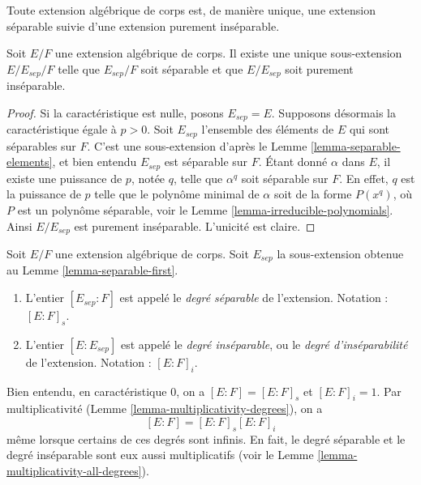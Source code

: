 \begin{lemma}
\label{lemma-separable-first}
\begin{slogan}
Toute extension algébrique de corps est, de manière unique, une extension
séparable suivie d'une extension purement inséparable.
\end{slogan}
Soit $E/F$ une extension algébrique de corps. Il existe une unique sous-extension
$E/E_{sep}/F$ telle que $E_{sep}/F$ soit séparable et que $E/E_{sep}$ soit
purement inséparable.
\end{lemma}

\begin{proof}
Si la caractéristique est nulle, posons $E_{sep} = E$. Supposons désormais la caractéristique
égale à $p > 0$. Soit $E_{sep}$ l'ensemble des éléments de $E$ qui sont séparables
sur $F$. C'est une sous-extension d'après le Lemme \ref{lemma-separable-elements},
et bien entendu $E_{sep}$ est séparable sur $F$. Étant donné $\alpha$ dans $E$,
il existe une puissance de $p$, notée $q$, telle que $\alpha^q$ soit séparable sur $F$.
En effet, $q$ est la puissance de $p$ telle que le polynôme minimal de
$\alpha$ soit de la forme $P(x^q)$, où $P$ est un polynôme séparable, voir le
Lemme \ref{lemma-irreducible-polynomials}. Ainsi $E/E_{sep}$ est purement
inséparable. L'unicité est claire.
\end{proof}

\begin{definition}
\label{definition-insep-degree}
Soit $E/F$ une extension algébrique de corps. Soit $E_{sep}$ la sous-extension
obtenue au Lemme \ref{lemma-separable-first}.
\begin{enumerate}
\item L'entier $[E_{sep} : F]$ est appelé le {\it degré séparable}
de l'extension. Notation : $[E : F]_s$.
\item L'entier $[E : E_{sep}]$ est appelé le {\it degré inséparable},
ou le {\it degré d'inséparabilité} de l'extension.
Notation : $[E : F]_i$.
\end{enumerate}
\end{definition}

\noindent
Bien entendu, en caractéristique $0$, on a $[E : F] = [E : F]_s$ et
$[E : F]_i = 1$. Par multiplicativité
(Lemme \ref{lemma-multiplicativity-degrees}), on a
$$
[E : F] = [E : F]_s [E : F]_i
$$
même lorsque certains de ces degrés sont infinis. En fait, le degré séparable
et le degré inséparable sont eux aussi multiplicatifs (voir le
Lemme \ref{lemma-multiplicativity-all-degrees}).

